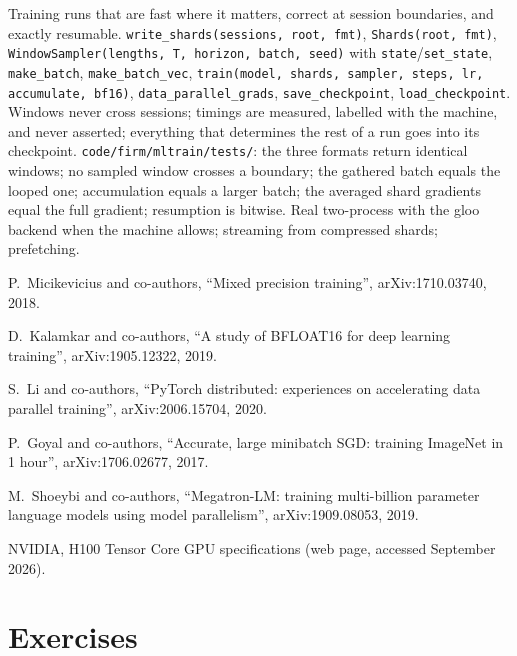 \begin{build}
 Training runs that are fast where it matters, correct at session boundaries, and exactly resumable.
 \texttt{write\_shards(sessions, root, fmt)}, \texttt{Shards(root, fmt)}, \texttt{WindowSampler(lengths, T,
horizon, batch, seed)} with \texttt{state}/\texttt{set\_state}, \texttt{make\_batch}, \texttt{make\_batch\_vec},
\texttt{train(model, shards, sampler, steps, lr, accumulate, bf16)}, \texttt{data\_parallel\_grads}, \texttt{save\_checkpoint},
\texttt{load\_checkpoint}.
 Windows never cross sessions; timings are measured, labelled with the machine, and never asserted; everything that
determines the rest of a run goes into its checkpoint.
 \texttt{code/firm/mltrain/tests/}: the three formats return identical windows; no sampled window crosses
a boundary; the gathered batch equals the looped one; accumulation equals a larger batch; the averaged shard gradients equal the
full gradient; resumption is bitwise.
 Real two-process  with the gloo backend when the machine allows; streaming from compressed
shards; prefetching.
\end{build}

\begin{omsources}
\item P.~Micikevicius and co-authors, ``Mixed precision training'', arXiv:1710.03740, 2018.
\item D.~Kalamkar and co-authors, ``A study of BFLOAT16 for deep learning training'', arXiv:1905.12322, 2019.
\item S.~Li and co-authors, ``PyTorch distributed: experiences on accelerating data parallel training'', arXiv:2006.15704, 2020.
\item P.~Goyal and co-authors, ``Accurate, large minibatch SGD: training ImageNet in 1 hour'', arXiv:1706.02677, 2017.
\item M.~Shoeybi and co-authors, ``Megatron-LM: training multi-billion parameter language models using model parallelism'',
arXiv:1909.08053, 2019.
\item NVIDIA, H100 Tensor Core GPU specifications (web page, accessed September 2026).
\end{omsources}

\section{Exercises}

